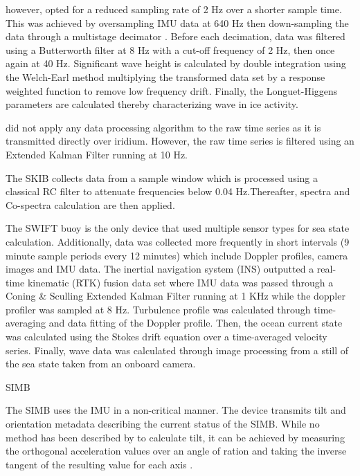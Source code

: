 \textcite{kohout2015device} however, opted for a reduced sampling rate of 2 Hz over a shorter sample time. This was achieved by oversampling IMU data at 640 Hz then down-sampling the data through a multistage decimator \cite{kohout2015device}. Before each decimation, data was filtered using a Butterworth filter at 8 Hz with a cut-off frequency of 2 Hz, then once again at 40 Hz. Significant wave height is calculated by double integration using the Welch-Earl method \cite{earle1996nondirectional,welch1967use} multiplying the transformed data set by a response weighted function to remove low frequency drift. Finally, the Longuet-Higgens parameters are calculated thereby characterizing wave in ice activity.

\textcite{doble2017robust} did not apply any data processing algorithm to the raw time series as it is transmitted directly over iridium. However, the raw time series is filtered using an Extended Kalman Filter running at 10 Hz.

The SKIB collects data from a sample window which is processed using a classical RC filter to attenuate frequencies below 0.04 Hz.Thereafter, \textcite{earle1996nondirectional} spectra and Co-spectra calculation are then applied.

The SWIFT buoy is the only device that used multiple sensor types for sea state calculation. Additionally, data was collected more frequently in short intervals (9 minute sample periods every 12 minutes) which include Doppler profiles, camera images and IMU data. The inertial navigation system (INS) outputted a real-time kinematic (RTK) fusion data set where IMU data was passed through a Coning \& Sculling Extended Kalman Filter running at 1 KHz \cite{thomson2012wave} while the doppler profiler was sampled at 8 Hz. Turbulence profile was calculated through time-averaging and data fitting of the Doppler profile. Then, the ocean current state was calculated using the Stokes drift equation over a time-averaged velocity series. Finally, wave data was calculated  through image processing from a still of the sea state taken from an onboard camera.

\par{SIMB}

The SIMB uses the IMU in a non-critical manner. The device transmits tilt and orientation metadata \cite{planck2019evolution} describing the current status of the SIMB. While no method has been described by \textcite{planck2019evolution} to calculate tilt, it can be achieved by measuring the orthogonal acceleration values over an angle of ration and taking the inverse tangent of the resulting value for each axis \cite{tuck2007tilt}.


